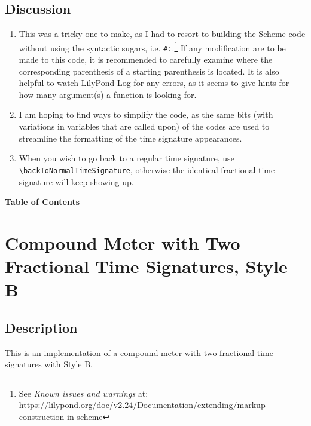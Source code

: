 \subsection{Discussion}
\begin{enumerate}
\item This was a tricky one to make, as I had to resort to building the Scheme code without using the syntactic sugars, i.e. \verb|#:|.\footnote{See \textit{Known issues and warnings} at: \url{https://lilypond.org/doc/v2.24/Documentation/extending/markup-construction-in-scheme}} If any modification are to be made to this code, it is recommended to carefully examine where the corresponding parenthesis of a starting parenthesis is located. It is also helpful to watch LilyPond Log for any errors, as it seems to give hints for how many argument(s) a function is looking for. 
\item I am hoping to find ways to simplify the code, as the same bits (with variations in variables that are called upon) of the codes are used to streamline the formatting of the time signature appearances. 
\item When you wish to go back to a regular time signature, use \verb|\backToNormalTimeSignature|, otherwise the identical fractional time signature will keep showing up.
\end{enumerate}
\hyperref[sec:toc]{\textbf{Table of Contents}}

\vfill \break



\section {Compound Meter with Two Fractional Time Signatures, Style B}

\hfill
{}
\hfill

\subsection{Description}
This is an implementation of a compound meter with two fractional time signatures with Style B.  

